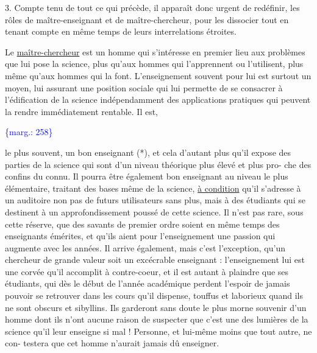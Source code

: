 \documentclass[11pt]{article}
\newcommand{\scanpage}[1]{\par\bigskip\noindent{\small\sffamily[scan #1]}\par}
\newcommand{\mspage}[1]{{\small\sffamily[p.\,#1]}}
\newcommand{\margin}[1]{\textcolor{blue}{\{\textsf{marg.:} #1\}}}
\newcommand{\uline}[1]{\underline{#1}}
\begin{document}
3. Compte tenu de tout ce qui précède, il apparaît donc urgent de redéfinir,
les rôles de maître-enseignant et de maître-chercheur, pour les dissocier
tout en tenant compte en même temps de leurs interrelations étroites.

Le \uline{maître-chercheur} est un homme qui s'intéresse en premier lieu
aux problèmes que lui pose la science, plus qu'aux hommes qui l'apprennent
ou l'utilisent, plus même qu'aux hommes qui la font. L'enseignement souvent
pour lui est surtout un moyen, lui assurant une position sociale qui lui
permette de se consacrer à l'édification de la science indépendamment des
applications pratiques qui peuvent la rendre immédiatement rentable. Il est,

\margin{258}

\clearpage
\scanpage{119/259}
\mspage{6}

le plus souvent, un bon enseignant (*), et cela d'autant plus qu'il expose des
parties de la science qui sont d'un niveau théorique plus élevé et plus pro-%
che des confins du connu. Il pourra être également bon enseignant au niveau
le plus élémentaire, traitant des bases même de la science, \uline{à condition}
qu'il s'adresse à un auditoire non pas de futurs utilisateurs sans plus,
mais à des étudiants qui se destinent à un approfondissement poussé de cette
science. Il n'est pas rare, sous cette réserve, que des savants de premier
ordre soient en même temps des enseignants émérites, et qu'ils aient pour
l'enseignement une passion qui augmente avec les années. Il arrive également,
mais c'est l'exception, qu'un chercheur de grande valeur soit un excécrable
enseignant : l'enseignement lui est une corvée qu'il accomplit à contre-coeur,
et il est autant à plaindre que ses étudiants, qui dès le début de l'année
académique perdent l'espoir de jamais pouvoir se retrouver dans les cours
qu'il dispense, touffus et laborieux quand ils ne sont obscurs et sibyllins.
Ils garderont sans doute le plus morne souvenir d'un homme dont ils n'ont
aucune raison de suspecter que c'est une des lumières de la science qu'il
leur enseigne si mal ! Personne, et lui-même moins que tout autre, ne con-%
testera que cet homme n'aurait jamais dû enseigner.
\end{document}
